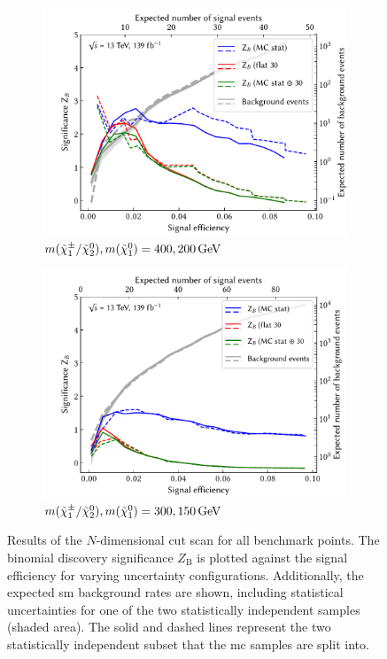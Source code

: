 \begin{figure}[hb]
\begin{subfigure}[b]{0.5\linewidth}
		\centering\includegraphics[width=1.0\textwidth]{N-1_cut_scan/z_vs_effs_400_200.pdf}
		\caption{$m(\charg/\neutr), m(\lsp) =  400, \SI{200}{\GeV}$}
	\end{subfigure}\hfill
	\begin{subfigure}[b]{0.5\linewidth}
		\centering\includegraphics[width=1.0\textwidth]{N-1_cut_scan/z_vs_effs_300_150.pdf}
		\caption{$m(\charg/\neutr), m(\lsp) =  300, \SI{150}{\GeV}$}
	\end{subfigure}\hfill

	\caption[N-dimensional cut scan results]{Results of the $N$-dimensional cut scan for all benchmark points. The binomial discovery significance $Z_\mathrm{B}$ is plotted against the signal efficiency for varying uncertainty configurations. Additionally, the expected \gls{sm} background rates are shown, including statistical uncertainties for one of the two statistically independent samples (shaded area). The solid and dashed lines represent the two statistically independent subset that the \gls{mc} samples are split into.}
	\label{fig:results_z_vs_eff_rest}
\end{figure}


